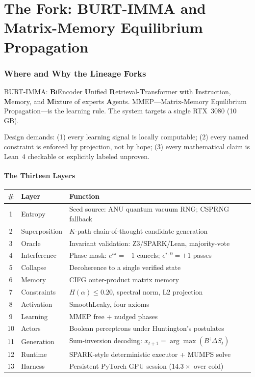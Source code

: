 \documentclass[11pt,letterpaper]{article}
\begin{document}
\part{The Fork: BURT-IMMA and Matrix-Memory Equilibrium Propagation}

\section{Where and Why the Lineage Forks}
\label{sec:fork}

BURT-IMMA: \textbf{B}iEncoder \textbf{U}nified \textbf{R}etrieval-\textbf{T}ransformer
with \textbf{I}nstruction, \textbf{M}emory, and \textbf{M}ixture of experts
\textbf{A}gents.  MMEP---Matrix-Memory Equilibrium Propagation---is the
learning rule.  The system targets a single RTX~3080 (10\,GB).

Design demands: (1) every learning signal is locally computable; (2) every
named constraint is enforced by projection, not by hope; (3) every mathematical
claim is Lean~4 checkable or explicitly labeled unproven.

\subsection{The Thirteen Layers}

\begin{center}
\renewcommand{\arraystretch}{1.2}
\begin{tabular}{clp{8cm}}
\toprule
\# & Layer & Function \\
\midrule
1 & Entropy & Seed source: ANU quantum vacuum RNG; CSPRNG fallback \\
2 & Superposition & $K$-path chain-of-thought candidate generation \\
3 & Oracle & Invariant validation: Z3/SPARK/Lean, majority-vote \\
4 & Interference & Phase mask: $e^{i\pi}=-1$ cancels; $e^{i\cdot 0}=+1$ passes \\
5 & Collapse & Decoherence to a single verified state \\
6 & Memory & CIFG outer-product matrix memory \\
7 & Constraints & $H(\alpha)\leq 0.20$, spectral norm, L2 projection \\
8 & Activation & SmoothLeaky, four axioms \\
9 & Learning & MMEP free + nudged phases \\
10 & Actors & Boolean perceptrons under Huntington's postulates \\
11 & Generation & Sum-inversion decoding: $x_{t+1}=\arg\max(B^\dagger \Delta S_t)$ \\
12 & Runtime & SPARK-style deterministic executor + MUMPS solve \\
13 & Harness & Persistent PyTorch GPU session ($14.3\times$ over cold) \\
\bottomrule
\end{tabular}
\end{center}
\end{document}
